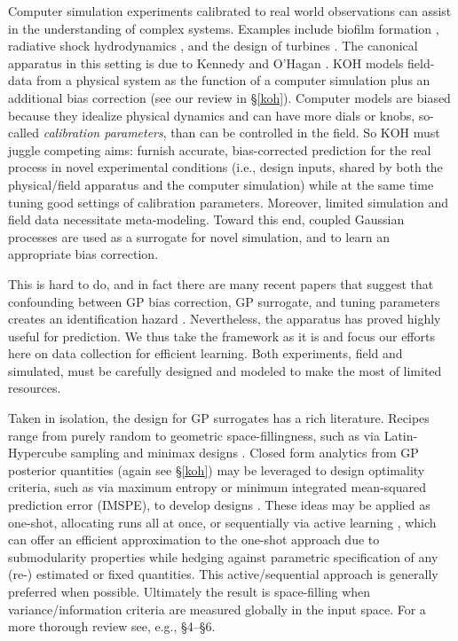 \documentclass[
]{article}
\begin{document}
Computer simulation experiments calibrated to real world observations
can assist in the understanding of complex systems. Examples include
biofilm formation \citep{johnson:2008}, radiative shock hydrodynamics
\citep{goh2013prediction}, and the design of turbines \citep{Huang:2018}. The
canonical apparatus in this setting is due to Kennedy and O'Hagan \citep[KOH,][]{kennedy2001bayesian}. KOH models field-data from a physical system as
the function of a computer simulation plus an additional bias
correction (see our review in \S\ref{koh}). Computer models are biased
because they idealize physical dynamics and can have more dials or
knobs, so-called \emph{calibration parameters}, than can be
controlled in the field. So KOH must juggle competing aims: furnish
accurate, bias-corrected prediction for the real process in novel
experimental conditions (i.e., design inputs, shared by both the
physical/field apparatus and the computer simulation) while at the same
time tuning good settings of calibration parameters. Moreover, limited
simulation and field data necessitate meta-modeling. Toward this end,
coupled Gaussian processes \citep[GPs,][]{williams2006gaussian} are used as a
surrogate \citep{gramacy2020surrogates} for novel simulation, and to learn an
appropriate bias correction.

This is hard to do, and in fact there are many recent papers that
suggest that confounding between GP bias correction, GP surrogate, and
tuning parameters creates an identification hazard
\citep{bayarri2009modularization, Higdon:2004, bryn2014learning, plumlee2017bayesian, gu2018jointly, tuo2015, tuo2016, wong2017, plumlee2019}. Nevertheless, the apparatus has proved highly useful for
prediction. We thus take the framework as it is and focus our efforts
here on data collection for efficient learning. Both experiments, field
and simulated, must be carefully designed and modeled to make the most
of limited resources.

Taken in isolation, the design for GP surrogates has a rich literature.
Recipes range from purely random to geometric space-fillingness, such as
via Latin-Hypercube sampling \citep[LHS,][]{mckay2000comparison} and minimax
designs \citep{johnson1990minimax}. Closed form analytics from GP posterior
quantities (again see \S\ref{koh}) may be leveraged to design optimality
criteria, such as via maximum entropy or minimum integrated mean-squared
prediction error (IMSPE), to develop designs \citep{sacks1989design}. These
ideas may be applied as one-shot, allocating runs all at once, or
sequentially via active learning \citep{seo2000gaussian}, which can offer an
efficient approximation to the one-shot approach due to submodularity
\citep{wei2015submodularity} properties while hedging against parametric
specification of any (re-) estimated or fixed quantities. This
active/sequential approach is generally preferred when possible.
Ultimately the result is space-filling when variance/information
criteria are measured globally in the input space. For a more thorough
review see, e.g., \citet{gramacy2020surrogates} \S4--\S6.
\end{document}
